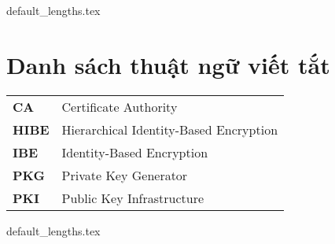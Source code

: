 \documentclass[class=report, crop=false]{standalone}
\begin{document}
	{default_lengths.tex}
	\baselineskip
	\chapter*{Danh sách thuật ngữ viết tắt}
	\begin{tabu}{>{\large\bfseries}m{2cm} >{\large}X[l]}
		CA		&	Certificate Authority						\\
		HIBE	&	Hierarchical Identity-Based Encryption 		\\
		IBE		&	Identity-Based Encryption 					\\
		PKG		&	Private Key Generator						\\
		PKI		&	Public Key Infrastructure					\\

	\end{tabu}
	\newpage
	{default_lengths.tex}
\end{document}
